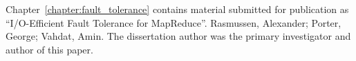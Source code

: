 Chapter~\ref{chapter:fault_tolerance} contains material submitted for
publication as ``I/O-Efficient Fault Tolerance for MapReduce''. Rasmussen,
Alexander; Porter, George; Vahdat, Amin. The dissertation author was the
primary investigator and author of this paper.

